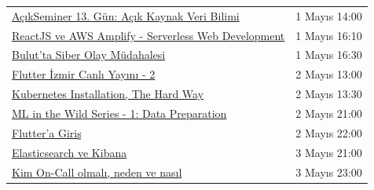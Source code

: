 \documentclass[11pt]{article}
\begin{document}
\begin{longtable}{|p{9.5cm}|l|}
\href{https://kommunity.com/tracikkaynak/events/acik-seminer-13-gun-acik-kaynak-kodlu-veri-bilimi-yaklasim-0a14d5dd}{AçıkSeminer 13. Gün: Açık Kaynak Veri Bilimi} & 1 Mayıs 14:00\\
\href{https://kommunity.com/react-native-turkey/events/etkinlik-iki-aws-amplify-ve-react-1735e369}{ReactJS ve AWS Amplify - Serverless Web Development} & 1 Mayıs 16:10\\
\href{https://kommunity.com/akademi/events/bulutta-siber-olay-mudahalesi-b92d1d73}{Bulut'ta Siber Olay Müdahalesi} & 1 Mayıs 16:30\\
\href{https://kommunity.com/flutter-izmir-1/events/flutter-izmir-canli-yayini-2-f1b24bbf}{Flutter İzmir Canlı Yayını - 2} & 2 Mayıs 13:00\\
\href{https://kommunity.com/cloud-and-serverless-turkey/events/kubernetes-hands-on-1-kubernetes-installation-the-hard-way-7bf5e75f}{Kubernetes Installation, The Hard Way} & 2 Mayıs 13:30\\
\href{https://kommunity.com/tensorflow-turkey/events/ml-in-the-wild-series-1-data-preparation-73ac8e24}{ML in the Wild Series - 1: Data Preparation} & 2 Mayıs 21:00\\
\href{https://kommunity.com/devnot-yazilimci-bulusmalari/events/fluttera-giris-e38503c7}{Flutter'a Giriş} & 2 Mayıs 22:00\\
\href{https://kommunity.com/teknolojisohbetleri/events/elasticsearch-ve-kibana-21cec45e}{Elasticsearch ve Kibana} & 3 Mayıs 21:00\\
\href{https://kommunity.com/cloud-and-serverless-turkey/events/ramazan-ozel-3-kim-on-call-olmali-neden-ve-nasil-24a94df1}{Kim On-Call olmalı, neden ve nasıl} & 3 Mayıs 23:00\\
\hline
\end{longtable}
\end{document}
